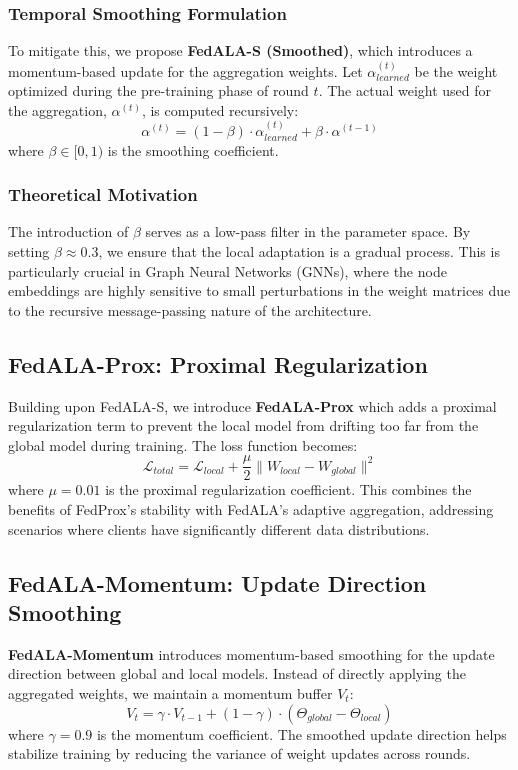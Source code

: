 \documentclass[10pt,conference,compsocconf,letterpaper]{IEEEtran}
\begin{document}
\subsubsection{Temporal Smoothing Formulation}
To mitigate this, we propose \textbf{FedALA-S (Smoothed)}, which introduces a momentum-based update for the aggregation weights. Let $\alpha_{learned}^{(t)}$ be the weight optimized during the pre-training phase of round $t$. The actual weight used for the aggregation, $\alpha^{(t)}$, is computed recursively:
\begin{equation}
\alpha^{(t)} = (1 - \beta) \cdot \alpha_{learned}^{(t)} + \beta \cdot \alpha^{(t-1)}
\end{equation}
where $\beta \in [0, 1)$ is the smoothing coefficient. 

\subsubsection{Theoretical Motivation}
The introduction of $\beta$ serves as a low-pass filter in the parameter space. By setting $\beta \approx 0.3$, we ensure that the local adaptation is a gradual process. This is particularly crucial in Graph Neural Networks (GNNs), where the node embeddings are highly sensitive to small perturbations in the weight matrices due to the recursive message-passing nature of the architecture.

\subsection{FedALA-Prox: Proximal Regularization}
Building upon FedALA-S, we introduce \textbf{FedALA-Prox} which adds a proximal regularization term to prevent the local model from drifting too far from the global model during training. The loss function becomes:
\begin{equation}
\mathcal{L}_{total} = \mathcal{L}_{local} + \frac{\mu}{2} \|W_{local} - W_{global}\|^2
\end{equation}
where $\mu = 0.01$ is the proximal regularization coefficient. This combines the benefits of FedProx's stability with FedALA's adaptive aggregation, addressing scenarios where clients have significantly different data distributions.

\subsection{FedALA-Momentum: Update Direction Smoothing}
\textbf{FedALA-Momentum} introduces momentum-based smoothing for the update direction between global and local models. Instead of directly applying the aggregated weights, we maintain a momentum buffer $V_t$:
\begin{equation}
V_t = \gamma \cdot V_{t-1} + (1 - \gamma) \cdot (\Theta_{global} - \Theta_{local})
\end{equation}
where $\gamma = 0.9$ is the momentum coefficient. The smoothed update direction helps stabilize training by reducing the variance of weight updates across rounds.
\end{document}
